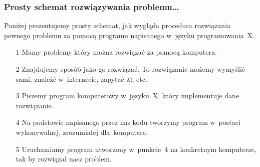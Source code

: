 \documentclass[10pt,t]{beamer}
\begin{document}
\begin{frame}
  \frametitle{Prosty schemat rozwiązywania problemu\ldots}


  Poniżej prezentujemy prosty schemat, jak wygląda procedura
  rozwiązania pewnego problemu za pomocą programu napisanego w~języku
  programowania~X.


  \begin{enumerate}
    \setlength{\itemsep}{1em}

  \item[1] Mamy problemy który można rozwiązać za pomocą komputera.



  \item[2] Znajdujemy sposób jako go rozwiązać. To rozwiązanie możemy
    wymyślić sami, znaleźć w~internecie, zapytać \textsc{ai}, etc.



  \item[3] Piszemy program komputerowy w~języku~X, który implementuje
    dane rozwiązanie.



  \item[4] Na podstawie napisanego przez nas kodu tworzymy program
    w~postaci wykonywalnej, zrozumiałej dla~komputera.



  \item[5] Uruchamiamy program utworzony w~punkcie~4 na konkretnym
    komputerze, tak by rozwiązał nasz problem.

  \end{enumerate}

\end{frame}
\end{document}
